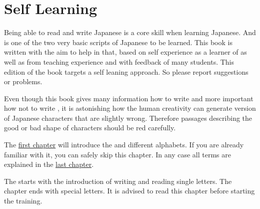 \section*{Self Learning}

\label{sec:SelfLearning}

Being able to read and write Japanese is a core skill when learning Japanese.
And \textbf{\jtopic} is one of the two very basic scripts of Japanese to be
learned. This book is written with the aim to help in that, based on self
experience as a learner of \jtopic{} as well as from teaching experience
and with feedback of many students. This edition of the book targets a self
leaning approach. So please report suggestions or problems.

Even though this book gives many information how to write and more important
how not to write \jtopic{}, it is astonishing how the human creativity can
generate version of Japanese \jtopic{} characters that are slightly wrong.
Therefore passages describing the good or bad shape of characters should be
red carefully.

The \hyperref[chap:JapaneseWritingSystem]{first chapter} will introduce the
 and different alphabets. If you are
already familiar with it, you can safely skip this chapter. In any case all
terms are explained in the \hyperref[chap:Terminology]{last chapter}.

The %
%
%
starts with the introduction of writing and reading single \textbf{\jtopic}
letters. The chapter ends with special \textbf{\jtopic} letters. It is advised
to read this chapter before starting the training.

